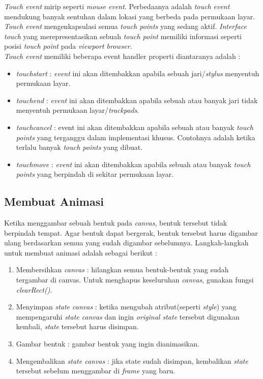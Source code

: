 \textit{Touch event} mirip seperti \textit{mouse event}. Perbedaanya adalah \textit{touch event} mendukung banyak sentuhan dalam lokasi yang berbeda pada permukaan layar. \textit{Touch event} mengenkapsulasi semua \textit{touch points} yang sedang aktif. \textit{Interface touch} yang merepresentasikan sebuah \textit{touch point} memiliki informasi seperti posisi \textit{touch point} pada \textit{viewport browser}.\\

\textit{Touch event} memiliki beberapa event handler properti diantaranya adalah :

\begin{itemize}
	\item \textit{touchstart} : \textit{event} ini akan ditembakkan apabila sebuah jari/\textit{stylus} menyentuh permukaan layar.
	\item \textit{touchend} : \textit{event} ini akan ditembakkan apabila sebuah atau banyak jari tidak menyentuh permukaan layar/\textit{trackpads}.
	\item \textit{touchcancel} : event ini akan ditembakkan apabila sebuah atau banyak \textit{touch points} yang terganggu dalam implementasi khusus. Contohnya adalah ketika terlalu banyak \textit{touch points} yang dibuat.
	\item \textit{touchmove} : \textit{event} ini akan ditembakkan apabila sebuah atau banyak \textit{touch points} yang berpindah di sekitar permukaan layar. 
\end{itemize}

\subsection{Membuat Animasi}
Ketika menggambar sebuah bentuk pada \textit{canvas}, bentuk tersebut tidak berpindah tempat. Agar bentuk dapat bergerak, bentuk tersebut harus digambar ulang berdasarkan semua yang sudah digambar sebelumnya. Langkah-langkah untuk membuat animasi adalah sebagai berikut :

\begin{enumerate}
	\item Membersihkan \textit{canvas} : hilangkan semua bentuk-bentuk yang sudah tergambar di canvas. Untuk menghapus keseluruhan \textit{canvas}, gunakan fungsi \textit{clearRect()}.
	\item Menyimpan \textit{state canvas} : ketika mengubah atribut(seperti \textit{style}) yang mempengaruhi \textit{state canvas} dan ingin \textit{original state} tersebut digunakan kembali, \textit{state} tersebut harus disimpan. 
	\item Gambar bentuk : gambar bentuk yang ingin dianimasikan.
	\item Mengembalikan \textit{state canvas} : jika state sudah disimpan, kembalikan \textit{state} tersebut sebelum menggambar di \textit{frame} yang baru.
\end{enumerate}

